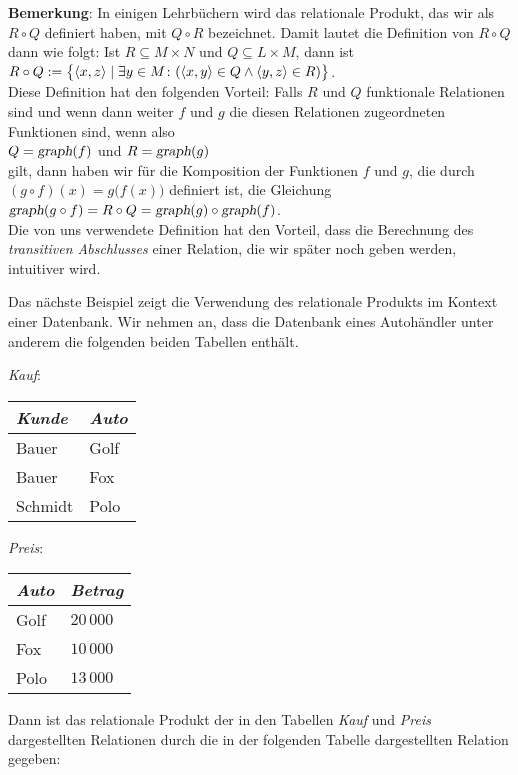 \noindent
\textbf{Bemerkung}: In einigen Lehrb\"{u}chern wird das relationale Produkt, 
das wir als $R \circ Q$ definiert haben, mit $Q \circ R$
bezeichnet. Damit lautet die Definition von $R \circ Q$  dann wie folgt:
Ist $R \subseteq M \times N$ und $Q \subseteq L \times M$, dann ist 
\\[0.2cm]
\hspace*{1.3cm}
$R \circ Q := \bigl\{ \pair(x,z) \mid \exists y \in M \colon(\pair(x,y) \in Q \wedge \pair(y,z) \in R) \bigr\}$.
\\[0.2cm]
Diese Definition hat den folgenden Vorteil: Falls $R$ und $Q$ funktionale Relationen sind und wenn
dann weiter $f$ und $g$ die diesen Relationen zugeordneten Funktionen sind, wenn also 
\\[0.2cm]
\hspace*{1.3cm}
$Q = \textsl{graph}(f)$ \quad und \quad $R = \textsl{graph}(g)$
\\[0.2cm]
gilt, dann haben wir f\"{u}r die Komposition der Funktionen $f$ und $g$, die durch $(g \circ
f)(x) = g\bigl(f(x)\bigr)$ 
definiert ist, die Gleichung
\\[0.2cm]
\hspace*{1.3cm}
$\textsl{graph}(g \circ f) = R \circ Q = \textsl{graph}(g) \circ \textsl{graph}(f)$.
\\[0.2cm]
Die von uns verwendete Definition hat den Vorteil, dass die Berechnung des 
\emph{transitiven Abschlusses}  einer Relation, die wir sp\"{a}ter noch geben werden, intuitiver wird.
\eox 


\example
Das n\"{a}chste Beispiel zeigt die Verwendung des relationale Produkts im Kontext einer
Datenbank.  Wir nehmen an, dass die Datenbank eines Autoh\"{a}ndler unter anderem die
folgenden beiden Tabellen enth\"{a}lt.
\begin{center}
\textsl{Kauf}:  \begin{tabular}[t]{|l|l|}
\hline
\textsl{Kunde} & \textsl{Auto} \\
\hline
\hline
  Bauer   & Golf \\
\hline
  Bauer   & Fox  \\
\hline
  Schmidt & Polo \\
\hline
  \end{tabular}
\qquad \textsl{Preis}:
  \begin{tabular}[t]{|l|l|}
\hline
\textsl{Auto} & \textsl{Betrag} \\
\hline
\hline
  Golf    & $20\,000$ \\
\hline
  Fox     & $10\,000$ \\
\hline
  Polo    & $13\,000$ \\
\hline
  \end{tabular}
\end{center}
Dann ist das relationale Produkt der in den Tabellen \textsl{Kauf} und \textsl{Preis}
dargestellten Relationen durch die in der folgenden Tabelle dargestellten Relation
gegeben:

